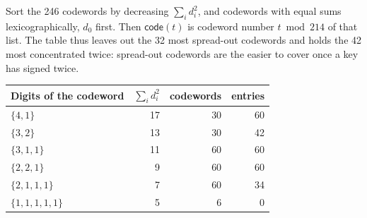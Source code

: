 \documentclass[11pt]{article}
\theoremstyle{plain}
\theoremstyle{definition}
\newcommand{\lut}{\mathsf{code}}
\begin{document}
Sort the 246 codewords by decreasing $\sum_id_i^2$, and codewords with equal sums lexicographically, $d_0$ first. Then $\lut(t)$ is codeword number $t\bmod214$ of that list. The table thus leaves out the 32 most spread-out codewords and holds the 42 most concentrated twice: spread-out codewords are the easier to cover once a key has signed twice.
\begin{center}
\begin{tabular}{@{}lrrr@{}}
\toprule
Digits of the codeword & $\sum_id_i^2$ & codewords & entries\\
\midrule
$\{4,1\}$ & 17 & 30 & 60\\
$\{3,2\}$ & 13 & 30 & 42\\
$\{3,1,1\}$ & 11 & 60 & 60\\
$\{2,2,1\}$ & 9 & 60 & 60\\
$\{2,1,1,1\}$ & 7 & 60 & 34\\
$\{1,1,1,1,1\}$ & 5 & 6 & 0\\
\bottomrule
\end{tabular}
\end{center}



\end{document}
